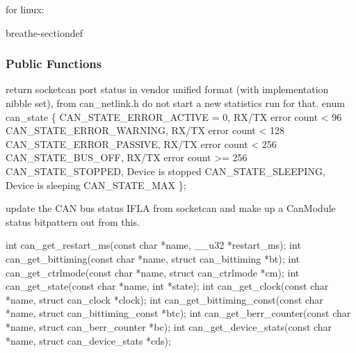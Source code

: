 \documentclass[a4paper,10pt,english]{sphinxmanual}
\begin{document}
\sphinxAtStartPar
for linux:

\begin{fulllineitems}
\label{\detokenize{vendors/systec:_CPPv412CSockCanScan}}%
\pysigstartmultiline
{}%
\pysigstopmultiline
\begin{sphinxuseclass}{breathe-sectiondef}\subsubsection*{Public Functions}

\begin{fulllineitems}
\label{\detokenize{vendors/systec:_CPPv4N12CSockCanScan13getPortStatusEv}}%
\pysigstartmultiline
{}%
\pysigstopmultiline
\sphinxAtStartPar
return socketcan port status in vendor unified format (with implementation nibble set), from can\_netlink.h do not start a new statistics run for that. enum can\_state \{ CAN\_STATE\_ERROR\_ACTIVE = 0, RX/TX error count \textless{} 96 CAN\_STATE\_ERROR\_WARNING, RX/TX error count \textless{} 128 CAN\_STATE\_ERROR\_PASSIVE, RX/TX error count \textless{} 256 CAN\_STATE\_BUS\_OFF, RX/TX error count \textgreater{}= 256 CAN\_STATE\_STOPPED, Device is stopped CAN\_STATE\_SLEEPING, Device is sleeping CAN\_STATE\_MAX \};

\sphinxAtStartPar
update the CAN bus status IFLA from socketcan and make up a CanModule status bitpattern out from this.

\sphinxAtStartPar
int can\_get\_restart\_ms(const char *name, \_\_u32 *restart\_ms); int can\_get\_bittiming(const char *name, struct can\_bittiming *bt); int can\_get\_ctrlmode(const char *name, struct can\_ctrlmode *cm); int can\_get\_state(const char *name, int *state); int can\_get\_clock(const char *name, struct can\_clock *clock); int can\_get\_bittiming\_const(const char *name, struct can\_bittiming\_const *btc); int can\_get\_berr\_counter(const char *name, struct can\_berr\_counter *bc); int can\_get\_device\_stats(const char *name, struct can\_device\_stats *cds); 

\end{fulllineitems}


\end{sphinxuseclass}
\end{fulllineitems}
\end{document}
